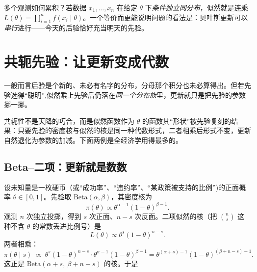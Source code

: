 
多个观测如何累积？若数据 $x_1,\dots,x_n$ 在给定 $\theta$ 下\emph{条件独立同分布}，似然就是连乘 $L(\theta)=\prod_{i=1}^n f(x_i\mid\theta)$。一个等价而更能说明问题的看法是：贝叶斯更新可以\emph{串行}进行——今天的后验恰好充当明天的先验。


\section{共轭先验：让更新变成代数}
\label{sec:bayes-2}

一般而言后验是个新的、未必有名字的分布，分母那个积分也未必算得出。但若先验选得``聪明'',似然乘上先验后仍落在\emph{同一个分布族}里，更新就只是把先验的参数挪一挪。


共轭性不是天降的巧合，而是似然函数作为 $\theta$ 的函数其``形状''被先验复刻的结果：只要先验的密度核与似然的核是同一种代数形式，二者相乘后形式不变，更新自然退化为参数的加减。下面两例是全经济学用得最多的。

\subsection{Beta--二项：更新就是数数}

设未知量是一枚硬币（或``成功率''、``违约率''、``某政策被支持的比例'')的正面概率 $\theta\in[0,1]$。先验取 $\mathrm{Beta}(\alpha,\beta)$，其密度核为
\[
    \pi(\theta)\propto \theta^{\alpha-1}(1-\theta)^{\beta-1} .
\]
观测 $n$ 次独立投掷，得到 $s$ 次正面、$n-s$ 次反面。二项似然的核（把 $\binom{n}{s}$ 这种不含 $\theta$ 的常数丢进比例号）是
\[
    L(\theta)\propto \theta^{s}(1-\theta)^{n-s} .
\]
两者相乘：
\[
    \pi(\theta\mid s)\;\propto\;
    \theta^{s}(1-\theta)^{n-s}\cdot\theta^{\alpha-1}(1-\theta)^{\beta-1}
    =\theta^{(\alpha+s)-1}(1-\theta)^{(\beta+n-s)-1} .
\]
这正是 $\mathrm{Beta}(\alpha+s,\ \beta+n-s)$ 的核。于是

